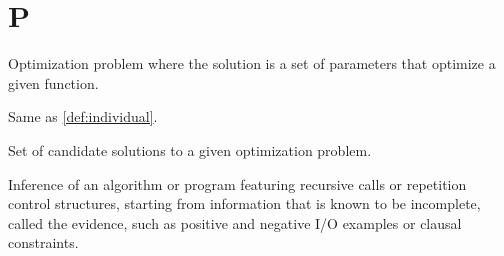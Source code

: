 \section*{P}
  \begin{definition}
  \label{def:parameter_optimization}
    Optimization problem where the solution is a set of parameters that 
    optimize a given function.
  \end{definition}

  \begin{definition}[Phenotype]
  \label{def:phenotype}
    Same as \vref{def:individual}.
  \end{definition}

  \begin{definition}[Population]
  \label{def:population}
    Set of candidate solutions to a given optimization problem.
  \end{definition}

  \begin{definition}
  \label{def:program_induction}
    Inference of an algorithm or program featuring recursive calls or 
    repetition control structures, starting from information that is known to 
    be incomplete, called the evidence, such as positive and negative I/O 
    examples or clausal constraints.
  \end{definition}